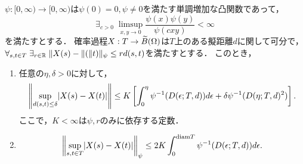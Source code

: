 \documentclass[uplatex,dvipdfmx]{jsreport}
\begin{document}
\begin{theorem}\label{thm-generalized-max-inequality}
    $\psi:[0,\infty)\to[0,\infty)$は$\psi(0)=0,\psi\ne 0$を満たす単調増加な凸関数であって，\[\exists_{c>0}\;\limsup_{x,y\to 0}\frac{\psi(x)\psi(y)}{\psi(cxy)}<\infty\]を満たすとする．
    確率過程$X:T\to\widetilde{B}(\Omega)$は$T$上のある擬距離$d$に関して可分で，$\forall_{s,t\in T}\;\exists_{r\in\mathbb{R}}\;\|X(s)-\|(\|t)\|_\psi\le rd(s,t)$を満たすとする．
    このとき，
    \begin{enumerate}
        \item 任意の$\eta,\delta>0$に対して，
        \[\left\|\sup_{d(s,t)\le\delta}\lvert X(s)-X(t)\rvert\right\|\le K\left[\int^\eta_0\psi^{-1}(D(\epsilon;T,d))d\epsilon+\delta\psi^{-1}(D(\eta;T,d)^2)\right].\]
        ここで，$K<\infty$は$\psi,r$のみに依存する定数．
        \item \[\left\|\sup_{s,t\in T}\lvert X(s)-X(t)\rvert\right\|_\psi\le 2K\int^{\mathrm{diam} T}_0\psi^{-1}(D(\epsilon;T,d))d\epsilon.\]
    \end{enumerate}
\end{theorem}
\end{document}
